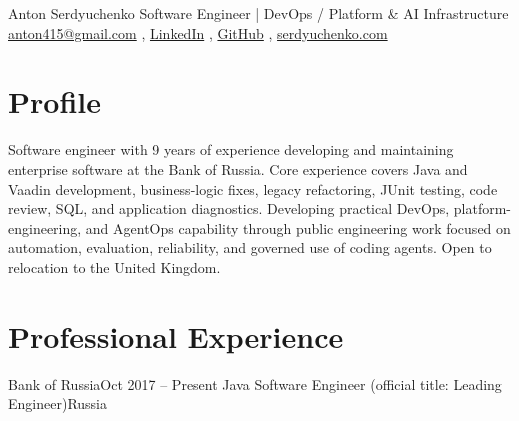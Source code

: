 \documentclass[a4paper,10pt]{article}
\begin{document}
\resumeHeader
  {Anton Serdyuchenko}
  {Software Engineer | DevOps / Platform \& AI Infrastructure}
  {\href{mailto:anton415@gmail.com}{anton415@gmail.com} \sep
   \href{https://www.linkedin.com/in/antonserdyuchenko}{LinkedIn} \sep
   \href{https://github.com/anton415}{GitHub} \sep
   \href{https://serdyuchenko.com}{serdyuchenko.com}}

\section{Profile}
\small
Software engineer with 9 years of experience developing and maintaining enterprise software at the Bank of Russia. Core experience covers Java and Vaadin development, business-logic fixes, legacy refactoring, JUnit testing, code review, SQL, and application diagnostics. Developing practical DevOps, platform-engineering, and AgentOps capability through public engineering work focused on automation, evaluation, reliability, and governed use of coding agents. Open to relocation to the United Kingdom.

\section{Professional Experience}
\resumeSubHeadingListStart
  \resumeSubheading
    {Bank of Russia}{Oct 2017 -- Present}
    {Java Software Engineer (official title: Leading Engineer)}{Russia}
    \resumeItemListStart
    \resumeItemListEnd
\resumeSubHeadingListEnd
\end{document}
